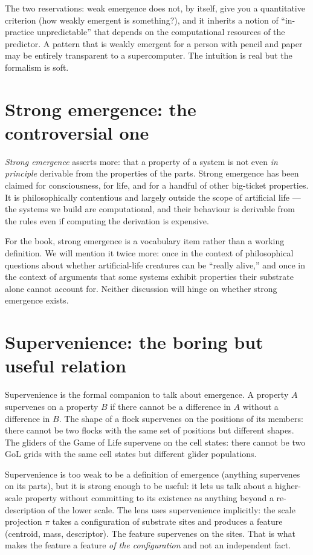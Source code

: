The two reservations: weak emergence does not, by itself, give you a
quantitative criterion (how weakly emergent is something?), and it
inherits a notion of ``in-practice unpredictable'' that depends on the
computational resources of the predictor. A pattern that is weakly
emergent for a person with pencil and paper may be entirely transparent
to a supercomputer. The intuition is real but the formalism is
soft.

\section{Strong emergence: the controversial one}

\emph{Strong emergence} asserts more: that a property of a system is not
even \emph{in principle} derivable from the properties of the parts.
Strong emergence has been claimed for consciousness, for life, and for a
handful of other big-ticket properties. It is philosophically contentious
and largely outside the scope of artificial life --- the systems we build
are computational, and their behaviour is derivable from the rules even
if computing the derivation is expensive.

For the book, strong emergence is a vocabulary item rather than a working
definition. We will mention it twice more: once in the context of
philosophical questions about whether artificial-life creatures can be
``really alive,'' and once in the context of arguments that some systems
exhibit properties their substrate alone cannot account for. Neither
discussion will hinge on whether strong emergence exists.

\section{Supervenience: the boring but useful relation}

Supervenience is the formal companion to talk about emergence. A property
$A$ supervenes on a property $B$ if there cannot be a difference in $A$
without a difference in $B$. The shape of a flock supervenes on the
positions of its members: there cannot be two flocks with the same set
of positions but different shapes. The gliders of the Game of Life
supervene on the cell states: there cannot be two GoL grids with the
same cell states but different glider populations.

Supervenience is too weak to be a definition of emergence (anything
supervenes on its parts), but it is strong enough to be useful: it lets
us talk about a higher-scale property without committing to its existence
as anything beyond a re-description of the lower scale. The lens uses
supervenience implicitly: the scale projection $\pi$ takes a
configuration of substrate sites and produces a feature (centroid, mass,
descriptor). The feature supervenes on the sites. That is what makes the
feature a feature \emph{of the configuration} and not an independent
fact.

